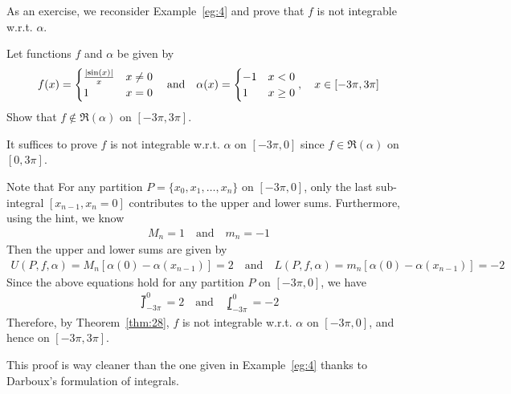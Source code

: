 \documentclass[thmcnt=section, 12pt]{my-elegantbook}
\begin{document}
As an exercise, we reconsider Example~\ref{eg:4} and prove that $f$ is not integrable w.r.t. $\alpha$.

\begin{exercise}
    Let functions $f$ and $\alpha$ be given by
    \begin{align*}
        f(x) = \begin{cases}
            \frac{\left\lvert \sin(x) \right\rvert}{x} &x \neq 0 \\
            1 &x = 0
        \end{cases}
        \quad\text{and}\quad 
        \alpha(x) = \begin{cases}
            -1 &x < 0 \\
            1 &x \geq 0
        \end{cases},
        \quad x \in [-3\pi, 3\pi]
    \end{align*}
    Show that $f \notin \mathfrak{R}(\alpha)$ on $[-3\pi, 3\pi]$.

\end{exercise}

\begin{solution}
    It suffices to prove $f$ is not integrable w.r.t. $\alpha$ on $[-3\pi, 0]$ since $f \in \mathfrak{R}(\alpha)$ on $[0, 3\pi]$.

    Note that For any partition $P = \{x_0, x_1, \ldots, x_n\}$ on $[-3\pi, 0]$, only the last sub-integral $[x_{n-1}, x_n = 0]$ contributes to the upper and lower sums. Furthermore, using the hint, we know 
    \begin{align*}
        M_n = 1
        \quad \text{and} \quad 
        m_n = -1
    \end{align*} 
    Then the upper and lower sums are given by
    \begin{align*}
        U(P,f,\alpha) = M_n [\alpha(0) - \alpha(x_{n-1})] = 2
        \quad\text{and}\quad
        L(P,f,\alpha) = m_n [\alpha(0) - \alpha(x_{n-1})] = -2
    \end{align*}
    Since the above equations hold for any partition $P$ on $[-3\pi, 0]$, we have 
    \begin{align*}
        \upint_{-3\pi}^0 = 2
        \quad\text{and}\quad
        \lowint_{-3\pi}^0 = -2
    \end{align*}
    Therefore, by Theorem~\ref{thm:28}, $f$ is not integrable w.r.t. $\alpha$ on $[-3\pi, 0]$, and hence on $[-3\pi, 3\pi]$.

    This proof is way cleaner than the one given in Example~\ref{eg:4} thanks to Darboux's formulation of integrals.
\end{solution}
\end{document}

